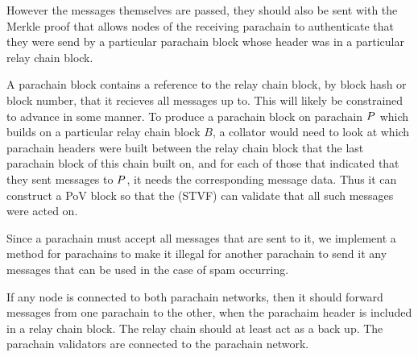However the messages themselves are passed, they should also be sent with the Merkle proof that allows nodes of the receiving parachain
to authenticate that they were send by a particular parachain block whose header was in a particular relay chain block.

A parachain block contains a reference to the relay chain block, by block hash or block number, that it recieves all messages up to.
This will likely be constrained to advance in some manner.
To produce a parachain block on parachain $P$ which builds on a particular relay chain block $B$,
a collator would need to look at which parachain headers were built between the relay chain block that the last parachain block of this chain built on,
and for each of those that indicated that they sent messages to $P$, it needs the corresponding message data.
Thus it can construct a PoV block so that the (STVF) can validate that all such messages were acted on.

Since a parachain must accept all messages that are sent to it,
we implement a method for parachains to make it illegal for another parachain to send it any messages that can be used in the case of spam occurring.

If any node is connected to both parachain networks, then it should forward messages from one parachain to the other,
when the parachaim header is included in a relay chain block. The relay chain should at least act as a back up.
The parachain validators are connected to the parachain network.
